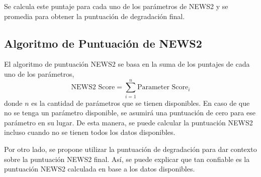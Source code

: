 Se calcula este puntaje para cada uno de los parámetros de NEWS2 y se promedia para obtener la puntuación de degradación final.

\subsection{Algoritmo de Puntuación de NEWS2}

El algoritmo de puntuación NEWS2 se basa en la suma de los puntajes de cada uno de los parámetros,
\begin{equation}
    \text{NEWS2 Score} = \sum_{i=1}^{n} \text{Parameter Score}_i
\end{equation}
donde $n$ es la cantidad de parámetros que se tienen disponibles.
En caso de que no se tenga un parámetro disponible, se asumirá una puntuación de cero para ese parámetro en su lugar.
De esta manera, se puede calcular la puntuación NEWS2 incluso cuando no se tienen todos los datos disponibles.

Por otro lado, se propone utilizar la puntuación de degradación para dar contexto sobre la puntuación NEWS2 final.
Así, se puede explicar que tan confiable es la puntuación NEWS2 calculada en base a los datos disponibles.